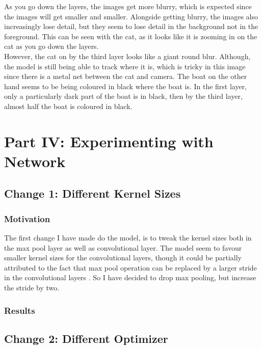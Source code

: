 \documentclass{article}
\begin{document}
    As you go down the layers, the images get more blurry, which is expected since the images will get smaller and smaller. Alongside getting blurry, the images also increasingly lose detail, but they seem to lose detail in the background not in the foreground. This can be seen with the cat, as it looks like it is zooming in on the cat as you go down the layers.\\
    
    However, the cat on by the third layer looks like a giant round blur. Although, the model is still being able to track where it is, which is tricky in this image since there is a metal net between the cat and camera. The boat on the other hand seems to be being coloured in black where the boat is. In the first layer, only a particularly dark part of the boat is in black, then by the third layer, almost half the boat is coloured in black.\\


    \section{Part IV: Experimenting with Network}


    \subsection{Change 1: Different Kernel Sizes}

    \subsubsection{Motivation}

    The first change I have made do the model, is to tweak the kernel sizes both in the max pool layer as well as convolutional layer. The model seem to favour smaller kernel sizes for the convolutional layers, though it could be partially attributed to the fact that max pool operation can be replaced by a larger stride in the convolutional layers \cite{maxpoolrep}. So I have decided to drop max pooling, but increase the stride by two.

    \subsubsection{Results}

    \subsection{Change 2: Different Optimizer}
\end{document}
